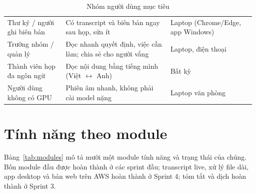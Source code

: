 \documentclass[12pt,a4paper]{report}
\begin{document}
\begin{table}[htbp]
  \centering
  \caption{Nhóm người dùng mục tiêu}
  \label{tab:personas}
  \small
  \begin{tabularx}{\linewidth}{@{}P{4.2cm}LP{3.8cm}@{}}
    \toprule
     &  &  \\
    \midrule
    Thư ký / người ghi biên bản & Có transcript và biên bản ngay sau họp, sửa ít & Laptop (Chrome/Edge, app Windows) \\
    Trưởng nhóm / quản lý & Đọc nhanh quyết định, việc cần làm; chia sẻ cho người vắng & Laptop, điện thoại \\
    Thành viên họp đa ngôn ngữ & Đọc nội dung bằng tiếng mình (Việt $\leftrightarrow$ Anh) & Bất kỳ \\
    Người dùng không có GPU & Phiên âm nhanh, không phải cài model nặng & Laptop văn phòng \\
    \bottomrule
  \end{tabularx}
\end{table}

\section{Tính năng theo module}

Bảng~\ref{tab:modules} mô tả mười một module tính năng và trạng thái của chúng. Bốn module đầu được hoàn thành ở
các sprint đầu; transcript live, xử lý file dài, app desktop và bản web trên AWS hoàn thành ở Sprint 4; tóm tắt
và dịch hoàn thành ở Sprint 3.
\end{document}
